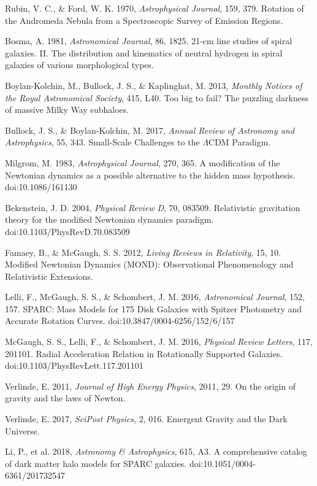 \documentclass[usenatbib]{mnras}
\begin{document}
\begin{thebibliography}{99}

 Rubin, V. C., \& Ford, W. K. 1970, \textit{Astrophysical Journal}, 159, 379. Rotation of the Andromeda Nebula from a Spectroscopic Survey of Emission Regions.

 Bosma, A. 1981, \textit{Astronomical Journal}, 86, 1825. 21-cm line studies of spiral galaxies. II. The distribution and kinematics of neutral hydrogen in spiral galaxies of various morphological types.

 Boylan-Kolchin, M., Bullock, J. S., \& Kaplinghat, M. 2013, \textit{Monthly Notices of the Royal Astronomical Society}, 415, L40. Too big to fail? The puzzling darkness of massive Milky Way subhaloes.

 Bullock, J. S., \& Boylan-Kolchin, M. 2017, \textit{Annual Review of Astronomy and Astrophysics}, 55, 343. Small-Scale Challenges to the $\Lambda$CDM Paradigm.

 Milgrom, M. 1983, \textit{Astrophysical Journal}, 270, 365. A modification of the Newtonian dynamics as a possible alternative to the hidden mass hypothesis. doi:10.1086/161130

 Bekenstein, J. D. 2004, \textit{Physical Review D}, 70, 083509. Relativistic gravitation theory for the modified Newtonian dynamics paradigm. doi:10.1103/PhysRevD.70.083509

 Famaey, B., \& McGaugh, S. S. 2012, \textit{Living Reviews in Relativity}, 15, 10. Modified Newtonian Dynamics (MOND): Observational Phenomenology and Relativistic Extensions.

 Lelli, F., McGaugh, S. S., \& Schombert, J. M. 2016, \textit{Astronomical Journal}, 152, 157. SPARC: Mass Models for 175 Disk Galaxies with Spitzer Photometry and Accurate Rotation Curves. doi:10.3847/0004-6256/152/6/157

 McGaugh, S. S., Lelli, F., \& Schombert, J. M. 2016, \textit{Physical Review Letters}, 117, 201101. Radial Acceleration Relation in Rotationally Supported Galaxies. doi:10.1103/PhysRevLett.117.201101

 Verlinde, E. 2011, \textit{Journal of High Energy Physics}, 2011, 29. On the origin of gravity and the laws of Newton.

 Verlinde, E. 2017, \textit{SciPost Physics}, 2, 016. Emergent Gravity and the Dark Universe.

 Li, P., et al. 2018, \textit{Astronomy \& Astrophysics}, 615, A3. A comprehensive catalog of dark matter halo models for SPARC galaxies. doi:10.1051/0004-6361/201732547

\end{thebibliography}
\end{document}
